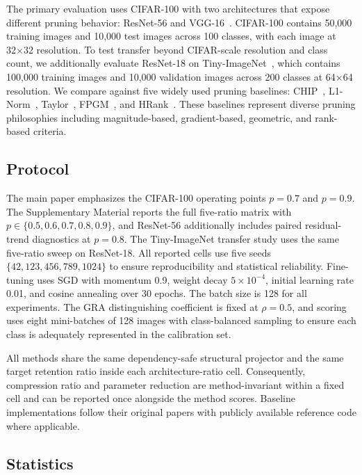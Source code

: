 \documentclass[preprint,12pt]{elsarticle}
\begin{document}
The primary evaluation uses CIFAR-100 with two architectures that expose different pruning behavior: ResNet-56 and VGG-16~\cite{he2016deep,simonyan2014very}. CIFAR-100 contains 50,000 training images and 10,000 test images across 100 classes, with each image at 32×32 resolution. To test transfer beyond CIFAR-scale resolution and class count, we additionally evaluate ResNet-18 on Tiny-ImageNet~\cite{russakovsky2015imagenet}, which contains 100,000 training images and 10,000 validation images across 200 classes at 64×64 resolution. We compare against five widely used pruning baselines: CHIP~\cite{sui2021chip}, L1-Norm~\cite{li2017pruning}, Taylor~\cite{molchanov2019taylor}, FPGM~\cite{he2019fpgm}, and HRank~\cite{lin2020hrank}. These baselines represent diverse pruning philosophies including magnitude-based, gradient-based, geometric, and rank-based criteria.

\subsection{Protocol}

The main paper emphasizes the CIFAR-100 operating points $p=0.7$ and $p=0.9$. The Supplementary Material reports the full five-ratio matrix with $p\in\{0.5,0.6,0.7,0.8,0.9\}$, and ResNet-56 additionally includes paired residual-trend diagnostics at $p=0.8$. The Tiny-ImageNet transfer study uses the same five-ratio sweep on ResNet-18. All reported cells use five seeds $\{42,123,456,789,1024\}$ to ensure reproducibility and statistical reliability. Fine-tuning uses SGD with momentum 0.9, weight decay $5\times 10^{-4}$, initial learning rate 0.01, and cosine annealing over 30 epochs. The batch size is 128 for all experiments. The GRA distinguishing coefficient is fixed at $\rho=0.5$, and scoring uses eight mini-batches of 128 images with class-balanced sampling to ensure each class is adequately represented in the calibration set.

All methods share the same dependency-safe structural projector and the same target retention ratio inside each architecture-ratio cell. Consequently, compression ratio and parameter reduction are method-invariant within a fixed cell and can be reported once alongside the method scores. Baseline implementations follow their original papers with publicly available reference code where applicable.

\subsection{Statistics}
\end{document}
